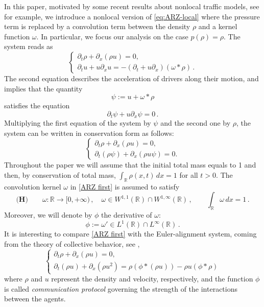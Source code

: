 \documentclass[11pt,a4paper,oneside]{amsart}
\newcommand\R{\mathbb{R}}
\begin{document}
In this paper, motivated by some recent results about nonlocal traffic models, see for example\cite{ChiarelloGoatin, 2018Gottlich,
chiarello2020micro}, we introduce a nonlocal version of \eqref{eq:ARZ-local}  where the pressure term is replaced by a convolution
term between the density $\rho$ and a kernel function $\omega$. In particular, we focus our analysis on the case $p(\rho)=\rho$.
The system reads as  
\begin{equation}\label{ARZ first}
    \begin{cases}
        \partial_t\rho+\partial_x(\rho u)=0,\\
        \partial_t u+u\partial_xu=-(\partial_t+u\partial_x)(\omega\ast\rho)\,.
    \end{cases}
\end{equation}
The second equation describes the acceleration of drivers along their motion, and implies that the quantity 
\begin{equation}\label{def:psi}
 \psi:=u+\omega\ast\rho
\end{equation}
satisfies the equation 
\begin{equation}\label{eq:cons-of-psi}
    \partial_t\psi+u\partial_x\psi=0\,.
\end{equation}
Multiplying the first equation of the system by $\psi$ and the second one by $\rho$, the system can be written in conservation form as follows:
\begin{equation}\label{ARZ_conservative}
    \begin{cases}
        \partial_t\rho+\partial_x(\rho u)=0,\\
        \partial_t(\rho\psi)+\partial_x(\rho u\psi)=0.
    \end{cases}
\end{equation}
Throughout the paper we will assume that the initial total mass equals to 1 and then, by conservation of total mass, $\int_\R\rho(x,t)\,dx=1$ for all $t>0$. 
The convolution kernel $\omega$ in \eqref{ARZ first} is assumed to satisfy
\begin{equation*}
    \textbf{(H)} \qquad \omega:\R\to[0,+\infty)\,,\quad \omega \in W^{1,1}(\R)\cap W^{1,\infty}(\R)\,,\qquad \int_\R\omega\,dx=1\,. 
\end{equation*}
Moreover, we will denote by $\phi$ the derivative of $\omega$: 
\begin{equation}\label{phi-def}
    \phi:=\omega' \in L^1(\R)\cap L^\infty(\R)\,.
\end{equation}
It is interesting to compare \eqref{ARZ first} with the Euler-alignment system, 
coming from the theory of collective behavior, see \cite{Leslie-Tan},
\begin{equation}\label{eq:Euler_alignment}
\begin{cases}
    \partial_t \rho +\partial_x (\rho u)=0,\\
    \partial_t(\rho u)+ \partial_x (\rho u^2)=\rho (\phi \ast(\rho u))-\rho u (\phi \ast \rho)
\end{cases}
\end{equation}
where $\rho$ and $u$ represent the density and velocity, respectively, and the function $\phi$ is called 
\textit{communication protocol} governing the strength of the interactions between the agents. 
\end{document}
